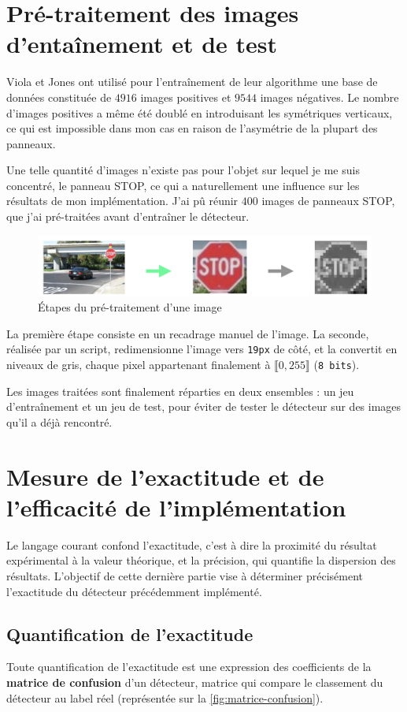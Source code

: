 \documentclass[12pt,a4paper]{article}
\begin{document}
\section{Pré-traitement des images d'entaînement et de test}
\label{sec:pre-traitement}
Viola et Jones ont utilisé pour l'entraînement de leur algorithme une base de données constituée de $4916$ images positives et $9544$ images négatives. Le nombre d'images positives a même été doublé en introduisant les symétriques verticaux, ce qui est impossible dans mon cas en raison de l'asymétrie de la plupart des panneaux. 

Une telle quantité d'images n'existe pas pour l'objet sur lequel je me suis concentré, le panneau STOP, ce qui a naturellement une influence sur les résultats de mon implémentation. J'ai pû réunir $400$ images de panneaux STOP, que j'ai pré-traitées avant d'entraîner le détecteur.

\begin{figure}[h]
    \includegraphics[scale = 0.5]{traitement}
    \centering
    \caption{Étapes du pré-traitement d'une image}
\end{figure}

La première étape consiste en un recadrage manuel de l'image. La seconde, réalisée par un script, redimensionne l'image vers \texttt{19px} de côté, et la convertit en niveaux de gris, chaque pixel appartenant finalement à $\llbracket 0, 255 \rrbracket$ (\texttt{8 bits}).

Les images traitées sont finalement réparties en deux ensembles : un jeu d'entraînement et un jeu de test, pour éviter de tester le détecteur sur des images qu'il a déjà rencontré.

\section{Mesure de l'exactitude et de l'efficacité de l'implémentation}
Le langage courant confond l'exactitude, c'est à dire la proximité du résultat expérimental à la valeur théorique, et la précision, qui quantifie la dispersion des résultats. L'objectif de cette dernière partie vise à déterminer précisément l'exactitude du détecteur précédemment implémenté.

\subsection{Quantification de l'exactitude}
Toute quantification de l'exactitude est une expression des coefficients de la \textbf{matrice de confusion} d'un détecteur, matrice qui compare le classement du détecteur au label réel (représentée sur la \autoref{fig:matrice-confusion}).
\end{document}
